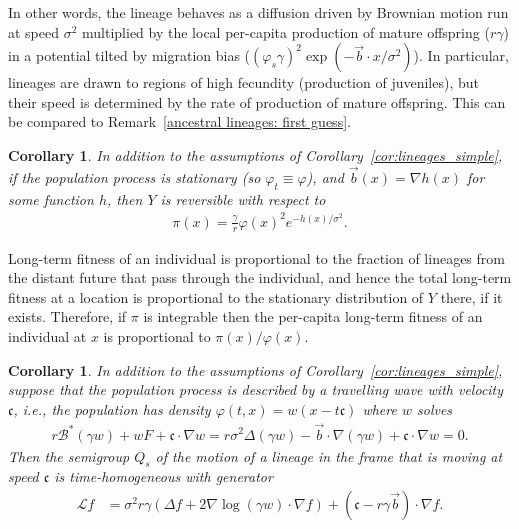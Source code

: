 \documentclass[12pt]{article}
\newtheorem{corollary}[theorem]{Corollary}
\newcommand{\grad}{\nabla}
\newcommand{\DG}{\mathcal{B}}  %
\newcommand{\meanq}{\vec b}    %
\newcommand{\wavespeed}{\mathfrak{c}}    %
\newcommand{\Lgen}{\mathcal{L}}    %
\newcommand{\comment}[1]{{\color{blue} \it #1}}
\numberwithin{equation}{section}
\begin{document}
In other words, 
the lineage behaves as a diffusion driven by Brownian motion 
run at speed $\sigma^2$ multiplied by the local per-capita production of 
mature offspring ($r \gamma$)
in a potential tilted by migration bias
($(\varphi_s \gamma)^2 \exp(-\meanq \cdot x / \sigma^2)$).
In particular, lineages are drawn to regions of high fecundity (production of juveniles), but their
speed is determined by the rate of production of mature offspring.
This can be compared to Remark~\ref{ancestral lineages: first guess}.

\begin{corollary} \label{cor:stationary_dist}
    In addition to the assumptions of Corollary~\ref{cor:lineages_simple},
    if the population process is stationary (so $\varphi_t \equiv \varphi$),
    and $\meanq(x) = \grad h(x)$ for some function $h$,
    then $Y$ is reversible with respect to
    \begin{align}
        \pi(x)
        =
        \frac{\gamma}{r} \varphi(x)^2 e^{-h(x) / \sigma^2} .
    \end{align}
\end{corollary}

Long-term fitness of an individual
is proportional to the fraction of lineages from the distant future that pass through the individual,
and hence the total long-term fitness at a location is proportional to
the stationary distribution of $Y$ there, if it exists.
Therefore,
if $\pi$ is integrable then the per-capita long-term fitness of an individual at $x$
is proportional to $\pi(x) / \varphi(x)$.

\begin{corollary} \label{cor:wavefront}
    In addition to the assumptions of Corollary~\ref{cor:lineages_simple},
    suppose that the population process is described by a travelling wave with 
velocity $\wavespeed$,
    i.e., the population has density
    $\varphi(t, x) = w(x - t \wavespeed)$
    where $w$ solves
    \begin{align*}
        r \DG^* (\gamma w) + w F + \wavespeed \cdot \grad w = 
r\sigma^2\Delta (\gamma w) -\meanq \cdot\grad (\gamma w) +\wavespeed \cdot \grad w =0 .
    \end{align*}
    Then the semigroup $Q_s$
    of the motion of a lineage in the frame that is moving at speed $\wavespeed$
    is time-homogeneous with generator
    \begin{align}
\label{Lgen}
        \Lgen f
        &=
        \sigma^2 r \gamma
        \left(
            \Delta f
            +
            2 \grad \log (\gamma w)
            \cdot \grad f
        \right)
        + (\wavespeed - r\gamma \meanq) \cdot \grad f .
    \end{align}
\end{corollary}
\end{document}
